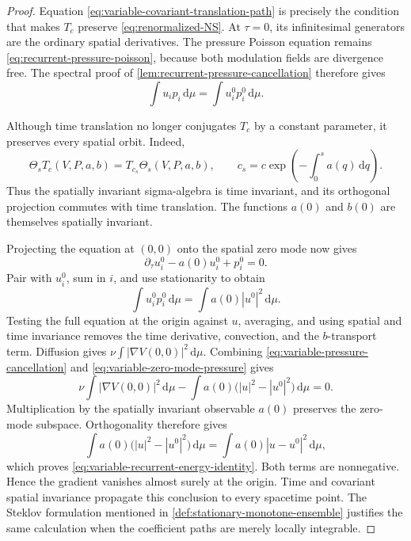 \documentclass[11pt]{amsart}
\numberwithin{equation}{section}
\theoremstyle{plain}
\theoremstyle{definition}
\theoremstyle{remark}
\newcommand{\dd}{\,\mathrm d}
\begin{document}
\begin{proof}
Equation \eqref{eq:variable-covariant-translation-path} is precisely the
condition that makes \(T_c\) preserve \eqref{eq:renormalized-NS}.  At
\(\tau=0\), its infinitesimal generators are the ordinary spatial
derivatives.  The pressure Poisson equation remains
\eqref{eq:recurrent-pressure-poisson}, because both modulation fields are
divergence free.  The spectral proof of
\cref{lem:recurrent-pressure-cancellation} therefore gives
\begin{equation}\label{eq:variable-pressure-cancellation}
 \int u_ip_i\dd\mu=\int u_i^0p_i^0\dd\mu.
\end{equation}

Although time translation no longer conjugates \(T_c\) by a constant
parameter, it preserves every spatial orbit.  Indeed,
\[
 \Theta_sT_c(V,P,a,b)
 =T_{c_s}\Theta_s(V,P,a,b),
 \qquad
 c_s=c\exp\!\left(-\int_0^sa(q)\dd q\right).
\]
Thus the spatially invariant sigma-algebra is time invariant, and its
orthogonal projection commutes with time translation.  The functions
\(a(0)\) and \(b(0)\) are themselves spatially invariant.

Projecting the equation at \((0,0)\) onto the spatial zero mode now gives
\[
 \partial_\tau u_i^0-a(0)u_i^0+p_i^0=0.
\]
Pair with \(u_i^0\), sum in \(i\), and use stationarity to obtain
\begin{equation}\label{eq:variable-zero-mode-pressure}
 \int u_i^0p_i^0\dd\mu
 =\int a(0)|u^0|^2\dd\mu.
\end{equation}
Testing the full equation at the origin against \(u\), averaging, and using
spatial and time invariance removes the time derivative, convection, and the
\(b\)-transport term.  Diffusion gives
\(\nu\int|\nabla V(0,0)|^2\dd\mu\).  Combining
\eqref{eq:variable-pressure-cancellation} and
\eqref{eq:variable-zero-mode-pressure} gives
\[
 \nu\int|\nabla V(0,0)|^2\dd\mu
 -\int a(0)\bigl(|u|^2-|u^0|^2\bigr)\dd\mu=0.
\]
Multiplication by the spatially invariant observable \(a(0)\) preserves the
zero-mode subspace.  Orthogonality therefore gives
\[
 \int a(0)\bigl(|u|^2-|u^0|^2\bigr)\dd\mu
 =\int a(0)|u-u^0|^2\dd\mu,
\]
which proves \eqref{eq:variable-recurrent-energy-identity}.  Both terms are
nonnegative.  Hence the gradient vanishes almost surely at the origin.
Time and covariant spatial invariance propagate this conclusion to every
spacetime point.  The Steklov formulation mentioned in
\cref{def:stationary-monotone-ensemble} justifies the same calculation when
the coefficient paths are merely locally integrable.
\end{proof}
\end{document}
